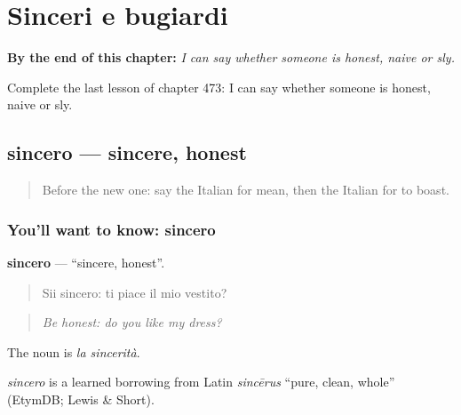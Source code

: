 
\chapter{Sinceri e bugiardi}
\label{ch:it-sinceri-e-bugiardi}

\begin{chapteropening}
\textbf{By the end of this chapter:} \emph{I can say whether someone is honest, naive or sly.}

Complete the last lesson of chapter 473: I can say whether someone is honest, naive or sly.
\end{chapteropening}

\section[sincero]{sincero — sincere, honest}

\label{lesson:IT-C473-sincero}



\begin{quote}
Before the new one: say the Italian for mean, then the Italian for to boast.
\end{quote}

\subsection*{You'll want to know: sincero}
\textbf{sincero} — \textquotedblleft{}sincere, honest\textquotedblright{}.

\begin{quote}
Sii sincero: ti piace il mio vestito?
\end{quote}

\begin{quote}
\emph{Be honest: do you like my dress?}
\end{quote}

The noun is \emph{la sincerità}.

\begin{cousinweb}
\emph{sincero} is a learned borrowing from Latin \emph{sincērus} \textquotedblleft{}pure, clean, whole\textquotedblright{} (EtymDB; Lewis \& Short).
\end{cousinweb}

